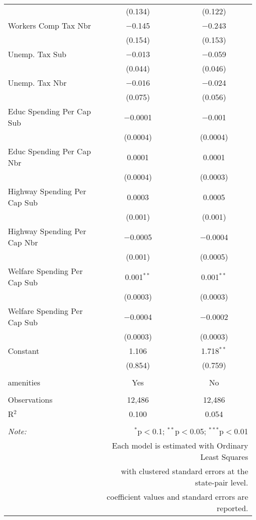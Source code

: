 \begin{table}[!htbp]
\begin{tabular}{@{\extracolsep{5pt}}lcc}
  & (0.134) & (0.122) \\ 
  Workers Comp Tax Nbr & $-$0.145 & $-$0.243 \\ 
  & (0.154) & (0.153) \\ 
  Unemp. Tax Sub & $-$0.013 & $-$0.059 \\ 
  & (0.044) & (0.046) \\ 
  Unemp. Tax Nbr & $-$0.016 & $-$0.024 \\ 
  & (0.075) & (0.056) \\ 
  Educ Spending Per Cap Sub & $-$0.0001 & $-$0.001 \\ 
  & (0.0004) & (0.0004) \\ 
  Educ Spending Per Cap Nbr & 0.0001 & 0.0001 \\ 
  & (0.0004) & (0.0003) \\ 
  Highway Spending Per Cap Sub & 0.0003 & 0.0005 \\ 
  & (0.001) & (0.001) \\ 
  Highway Spending Per Cap Nbr & $-$0.0005 & $-$0.0004 \\ 
  & (0.001) & (0.0005) \\ 
  Welfare Spending Per Cap Sub & 0.001$^{**}$ & 0.001$^{**}$ \\ 
  & (0.0003) & (0.0003) \\ 
  Welfare Spending Per Cap Sub & $-$0.0004 & $-$0.0002 \\ 
  & (0.0003) & (0.0003) \\ 
  Constant & 1.106 & 1.718$^{**}$ \\ 
  & (0.854) & (0.759) \\ 
 \hline \\[-1.8ex] 
amenities & Yes & No \\ 
\hline \\[-1.8ex] 
Observations & 12,486 & 12,486 \\ 
R$^{2}$ & 0.100 & 0.054 \\ 
\hline 
\hline \\[-1.8ex] 
\textit{Note:}  & \multicolumn{2}{r}{$^{*}$p$<$0.1; $^{**}$p$<$0.05; $^{***}$p$<$0.01} \\ 
 & \multicolumn{2}{r}{Each model is estimated with Ordinary Least Squares} \\ 
 & \multicolumn{2}{r}{with clustered standard errors at the state-pair level.} \\ 
 & \multicolumn{2}{r}{coefficient values and standard errors are reported.} \\ 
\end{tabular} 
\end{table} 
